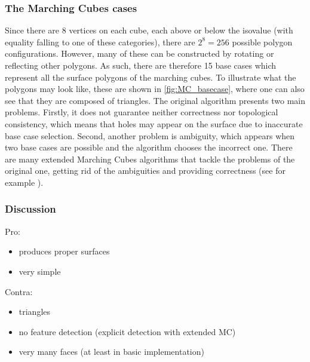 \subsubsection{The Marching Cubes cases}
Since there are 8 vertices on each cube, each above or below the isovalue (with equality falling to one of these categories), there are $2^8=256$ possible polygon configurations. However, many of these can be constructed by rotating or reflecting other polygons. As such, there are therefore 15 base cases which represent all the surface polygons of the marching cubes. To illustrate what the polygons may look like, these are shown in \autoref{fig:MC_basecase}, where one can also see that they are composed of triangles. 
The original algorithm presents two main problems. Firstly, it does not guarantee neither correctness nor topological consistency, which means that holes may appear on the surface due to inaccurate base case selection. Second, another problem is ambiguity, which appears when two base cases are possible and the algorithm chooses the incorrect one. There are many extended Marching Cubes algorithms that tackle the problems of the original one, getting rid of the ambiguities and providing correctness (see for example \cite{ExtendedMC} ).

\subsubsection{Discussion}
Pro:
\begin{itemize}
\item produces proper  surfaces
\item very simple
\end{itemize}
Contra:
\begin{itemize}
\item triangles
\item no feature detection (explicit detection with extended MC)
\item very many faces (at least in basic implementation)
\end{itemize}